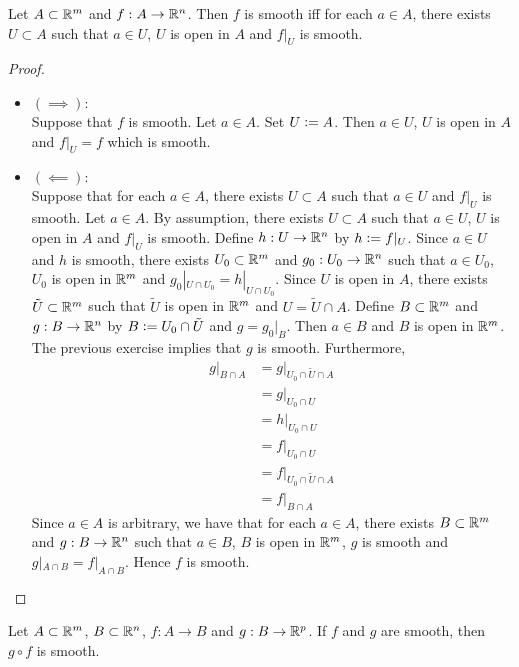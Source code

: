 \documentclass{book}
\begin{document}
	\begin{ex} 
		Let $A \subset \mathbb{R}^m$ and $f:A \rightarrow \mathbb{R}^n$. Then $f$ is smooth iff for each $a \in A$, there exists $U \subset A$ such that $a \in U$, $U$ is open in $A$ and $f|_U$ is smooth.  
	\end{ex}

	\begin{proof} \
		\begin{itemize}
			\item $(\implies): $ \\
			Suppose that $f$ is smooth. Let $a \in A$. Set $U \vcentcolon= A$. Then $a \in U$, $U$ is open in $A$ and $f|_U = f$ which is smooth. 
			\item $(\impliedby): $ \\
			Suppose that for each $a \in A$, there exists $U \subset A$ such that $a \in U$ and $f|_U$ is smooth. Let $a \in A$. By assumption, there exists $U \subset A$ such that $a \in U$, $U$ is open in $A$ and $f|_U$ is smooth. Define $h:U \rightarrow \mathbb{R}^n$ by $h \vcentcolon= f|_U$. Since $a \in U$ and $h$ is smooth, there exists $U_0 \subset \mathbb{R}^m$ and $g_0:U_0 \rightarrow \mathbb{R}^n$ such that $a \in U_0$, $U_0$ is open in $\mathbb{R}^m$ and $g_0|_{U \cap U_0} = h|_{U \cap U_0}$. Since $U$ is open in $A$, there exists $\tilde{U} \subset \mathbb{R}^m$ such that $\tilde{U}$ is open in $\mathbb{R}^m$ and $U = \tilde{U} \cap A$. Define $B \subset \mathbb{R}^m$ and $g:B \rightarrow \mathbb{R}^n$ by $B \vcentcolon= U_0 \cap \tilde{U}$ and $g = g_0|_B$. Then $a \in B$ and $B$ is open in $\mathbb{R}^m$. The previous exercise implies that $g$ is smooth. Furthermore,
			\begin{align*}
				g|_{B \cap A}
				& = g|_{U_0 \cap \tilde{U} \cap A} \\
				& = g|_{U_0 \cap U} \\
				& = h|_{U_0 \cap U} \\
				& = f|_{U_0 \cap U} \\
				& = f|_{U_0 \cap \tilde{U} \cap A} \\
				& = f|_{B \cap A} 
			\end{align*}
			Since $a \in A$ is arbitrary, we have that for each $a \in A$, there exists $B \subset \mathbb{R}^m$ and $g:B \rightarrow \mathbb{R}^n$ such that $a \in B$, $B$ is open in $\mathbb{R}^m$, $g$ is smooth and $g|_{A \cap B} = f|_{A \cap B}$. Hence $f$ is smooth.
		\end{itemize}
	\end{proof}
	
	\begin{ex} 
		Let $A \subset \mathbb{R}^m$, $B \subset \mathbb{R}^n$, $f:A \rightarrow B$ and $g: B \rightarrow \mathbb{R}^p$. If $f$ and $g$ are smooth, then $g \circ f$ is smooth.
	\end{ex}
	
\end{document}
